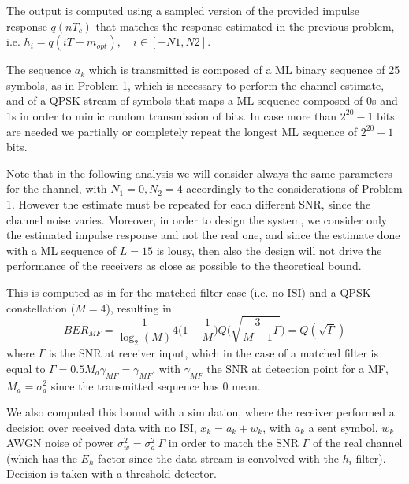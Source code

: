 \documentclass[10pt]{article}
\begin{document}
The output is computed using a sampled version of the provided impulse response $q(nT_c)$ that matches the response estimated in the previous problem, i.e. $h_i = q(iT + m_{opt}), \quad i \in [-N1, N2]$. 

The sequence $a_k$ which is transmitted is composed of a ML binary sequence of 25 symbols, as in Problem 1, which is necessary to perform the channel estimate, and of a QPSK stream of symbols that maps a ML sequence composed of 0s and 1s in order to mimic random transmission of bits. In case more than $2^{20}-1$ bits are needed we partially or completely repeat the longest ML sequence of $2^{20}-1$ bits.

Note that in the following analysis we will consider always the same parameters for the channel, with $N_1 = 0, N_2 = 4$ accordingly to the considerations of Problem 1. However the estimate must be repeated for each different SNR, since the channel noise varies. Moreover, in order to design the system, we consider only the estimated impulse response and not the real one, and since the estimate done with a ML sequence of $L = 15$ is lousy, then also the design will not drive the performance of the receivers as close as possible to the theoretical bound. 

This is computed as in \cite{bc} for the matched filter case (i.e. no ISI) and a QPSK constellation ($M=4$), resulting in 
\begin{equation}
	BER_{MF} = \frac{1}{\log_2 (M)} 4 \bigg(1- \frac{1}{M} \bigg) Q\bigg(\sqrt{\frac{3}{M-1} \Gamma}\bigg) = Q(\sqrt{\Gamma})
	\label{eq:BERmf}
\end{equation}
where $\Gamma$ is the SNR at receiver input, which in the case of a matched filter is equal to $\Gamma = 0.5 M_a \gamma_{MF}= \gamma_{MF}$, with $\gamma_{MF}$ the SNR at detection point for a MF, $M_a = \sigma_a^2$ since the transmitted sequence has 0 mean.

We also computed this bound with a simulation, where the receiver performed a decision over received data with no ISI, $x_k = a_k + w_k$, with $a_k$ a sent symbol, $w_k$ AWGN noise of power $\sigma_w^2 = \sigma_a^2 \ \Gamma$ in order to match the SNR $\Gamma$ of the real channel (which has the $E_h$ factor since the data stream is convolved with the $h_i$ filter). Decision is taken with a threshold detector.

\end{document}
